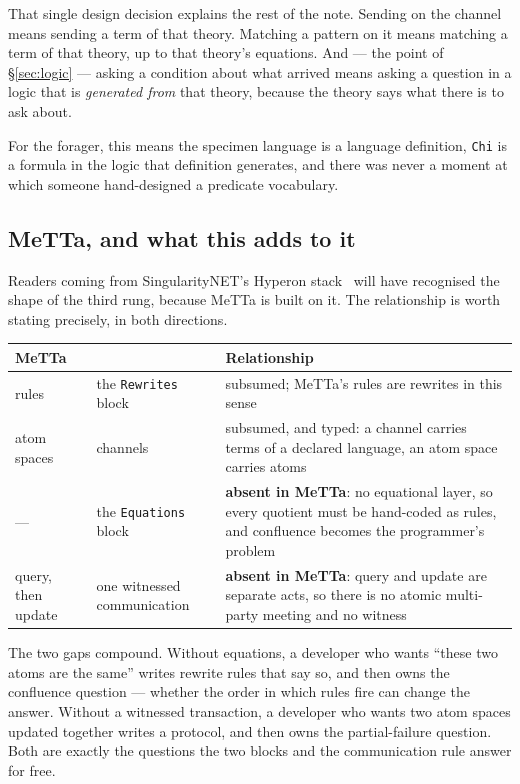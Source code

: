 That single design decision explains the rest of the note. Sending on the
channel means sending a term of that theory. Matching a pattern on it means
matching a term of that theory, up to that theory's equations. And --- the point
of \S\ref{sec:logic} --- asking a condition about what arrived means asking a
question in a logic that is \emph{generated from} that theory, because the
theory says what there is to ask about.

For the forager, this means the specimen language is a language definition,
\texttt{Chi} is a formula in the logic that definition generates, and there was
never a moment at which someone hand-designed a predicate vocabulary.

\subsection{MeTTa, and what this adds to it}
\label{sec:metta}

Readers coming from SingularityNET's Hyperon stack~\cite{Hyperon} will have
recognised the shape of the third rung, because MeTTa is built on it. The relationship is worth
stating precisely, in both directions.

\begin{center}
\small
\begin{tabular}{@{}L{0.24\textwidth}L{0.30\textwidth}L{0.38\textwidth}@{}}
\toprule
\textbf{MeTTa} & \textbf{\flang{}} & \textbf{Relationship} \\
\midrule
rules &
the \texttt{Rewrites} block &
subsumed; MeTTa's rules are rewrites in this sense \\[3pt]
atom spaces &
channels &
subsumed, and typed: a channel carries terms of a declared language, an
atom space carries atoms \\[3pt]
--- &
the \texttt{Equations} block &
\textbf{absent in MeTTa}: no equational layer, so every quotient must be
hand-coded as rules, and confluence becomes the programmer's problem \\[3pt]
query, then update &
one witnessed communication &
\textbf{absent in MeTTa}: query and update are separate acts, so there is no
atomic multi-party meeting and no witness \\
\bottomrule
\end{tabular}
\end{center}

The two gaps compound. Without equations, a developer who wants ``these two
atoms are the same'' writes rewrite rules that say so, and then owns the
confluence question --- whether the order in which rules fire can change the
answer. Without a witnessed transaction, a developer who wants two atom spaces
updated together writes a protocol, and then owns the partial-failure question.
Both are exactly the questions the two blocks and the communication rule
answer for free.

